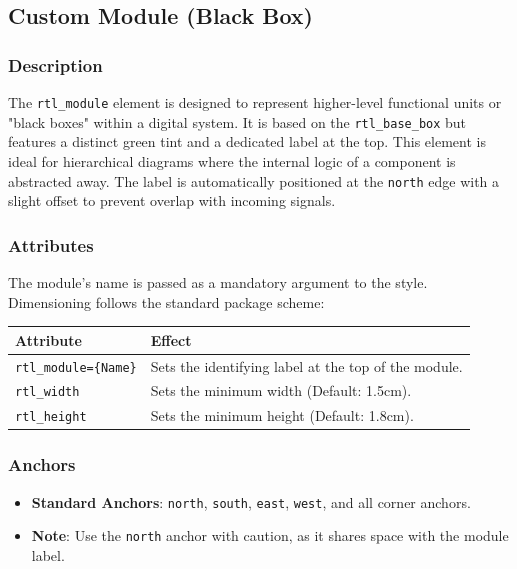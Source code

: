 
\subsection{\sffamily Custom Module (Black Box)}

    \subsubsection{\sffamily Description}
        The \texttt{rtl\_module} element is designed to represent higher-level functional units or "black boxes" within a digital system. It is based on the \texttt{rtl\_base\_box} but features a distinct green tint and a dedicated label at the top. 
        This element is ideal for hierarchical diagrams where the internal logic of a component is abstracted away. The label is automatically positioned at the \texttt{north} edge with a slight offset to prevent overlap with incoming signals.

    \subsubsection{\sffamily Attributes}
        The module's name is passed as a mandatory argument to the style. Dimensioning follows the standard package scheme:

    \begin{center}
        \begin{tabular}{lp{8cm}}
        \toprule
            \textbf{Attribute} & \textbf{Effect} \\
            \midrule
            \texttt{rtl\_module=\{Name\}} & Sets the identifying label at the top of the module. \\
            \texttt{rtl\_width} & Sets the minimum width (Default: 1.5cm). \\
            \texttt{rtl\_height} & Sets the minimum height (Default: 1.8cm). \\
            \bottomrule
        \end{tabular}
    \end{center}

    \subsubsection{\sffamily Anchors}
        \begin{itemize}
            \item \textbf{Standard Anchors}: \texttt{north}, \texttt{south}, \texttt{east}, \texttt{west}, and all corner anchors.
            \item \textbf{Note}: Use the \texttt{north} anchor with caution, as it shares space with the module label.
        \end{itemize}

